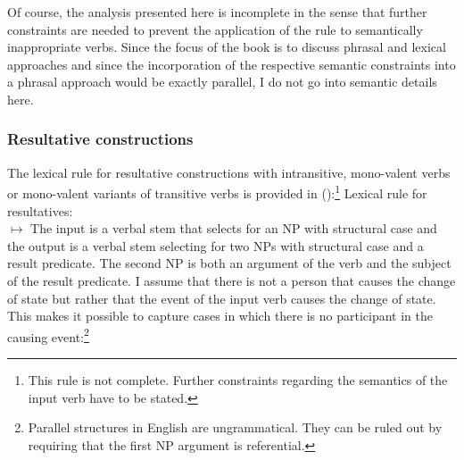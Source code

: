 Of course, the analysis presented here is incomplete in the sense that further constraints are
needed to prevent the application of the rule to semantically inappropriate verbs. Since
the focus of the book is to discuss phrasal and lexical approaches and since the incorporation of
the respective semantic constraints into a phrasal approach would be exactly parallel, I do not go
into semantic details here.

\subsubsection{Resultative constructions}

The lexical rule for resultative constructions with intransitive, mono-valent verbs or mono-valent variants of
transitive verbs is provided in ():\footnote{%
  This rule is not complete. Further constraints regarding the semantics of the input verb have to
  be stated.%
}
\ea
Lexical rule for resultatives:\\
$\mapsto$
\z
The input is a verbal stem that selects for an NP with structural case and the output is a verbal
stem selecting for two NPs with structural case and a result predicate. The second NP is both an
argument of the verb and the subject of the result predicate. I assume that there is not a person that causes
the change of state but rather that the event of the input verb  causes the change of
state. This makes it possible to capture cases in which there is no participant in the causing
event:\footnote{%
   Parallel structures in English are ungrammatical. They can be ruled out by requiring that the
   first NP argument is referential.
}


